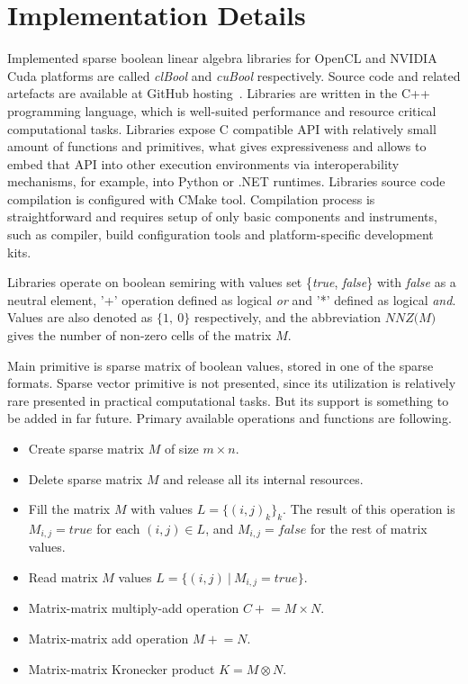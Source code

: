 \section{Implementation Details}



Implemented sparse boolean linear algebra libraries for OpenCL and NVIDIA Cuda platforms are called
\textit{clBool} and \textit{cuBool} respectively. Source code and related artefacts are available at GitHub 
hosting~\cite{todo1, todo2}. Libraries are written in the C++ programming language, which is well-suited  performance and resource critical computational tasks. Libraries expose C compatible API with 
relatively small amount of functions and primitives, what gives expressiveness and allows to embed that API 
into other execution environments via interoperability mechanisms, for example, into Python or .NET runtimes. 
Libraries source code compilation is configured with CMake tool. Compilation process is 
straightforward and requires setup of only basic components and instruments, such as compiler, build 
configuration tools and platform-specific development kits.

Libraries operate on boolean semiring with values set \{\textit{true}, \textit{false}\} with \textit{false} as 
a neutral element, '+' operation defined as logical \textit{or} and '*' defined as logical \textit{and}. Values are also denoted as $\{1,~0\}$ respectively, and the abbreviation $\textit{NNZ(M)}$ gives the number of non-zero cells of the matrix $M$.

Main primitive is sparse matrix of boolean values, stored in one of the sparse formats. Sparse vector 
primitive is not presented, since its utilization is relatively rare presented in practical computational 
tasks. But its support is something to be added in far future. Primary available operations and functions are following.

\begin{itemize}
    \item Create sparse matrix $M$ of size $m \times n$.
    \item Delete sparse matrix $M$ and release all its internal resources.
    \item Fill the matrix $M$ with values $L = \{(i,j)_k\}_k$. The result of this operation is $M_{i,j} = 
    \textit{true}$ for each $(i, j) \in L$, and $M_{i,j} = \textit{false}$ for the rest of matrix values.
    \item Read matrix $M$ values $L = \{(i, j)~|~M_{i,j} = \textit{true}\}$.
    \item Matrix-matrix multiply-add operation $C \mathrel{+}= M \times N$.
    \item Matrix-matrix add operation $M \mathrel{+}= N$.
    \item Matrix-matrix Kronecker product $K = M \otimes N$.
\end{itemize}

